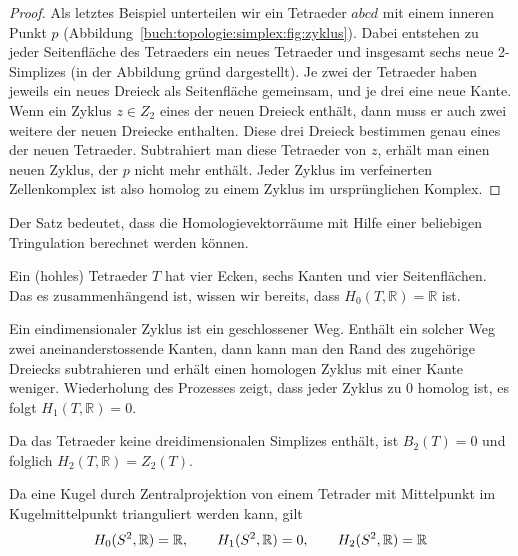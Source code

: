 \begin{proof}
Als letztes Beispiel unterteilen wir ein Tetraeder $abcd$ mit
einem inneren Punkt $p$ (Abbildung~\ref{buch:topologie:simplex:fig:zyklus}).
%
Dabei entstehen zu jeder Seitenfläche des Tetraeders ein neues 
Tetraeder und insgesamt sechs neue 2-Simplizes (in der Abbildung
gründ dargestellt).
Je zwei der Tetraeder haben jeweils ein neues Dreieck als Seitenfläche
gemeinsam, und je drei eine neue Kante.
Wenn ein Zyklus $z\in Z_2$ eines der neuen Dreieck enthält, dann
muss er auch zwei weitere der neuen Dreiecke enthalten.
Diese drei Dreieck bestimmen genau eines der neuen Tetraeder.
Subtrahiert man diese Tetraeder von $z$, erhält man einen neuen
Zyklus, der $p$ nicht mehr enthält.
Jeder Zyklus im verfeinerten Zellenkomplex ist also homolog
zu einem Zyklus im ursprünglichen Komplex.
\end{proof}

Der Satz bedeutet, dass die Homologievektorräume mit Hilfe einer
beliebigen Tringulation berechnet werden können.

\begin{beispiel}
\label{buch:topologie:euler:beispiel:tetraeder}
Ein (hohles) Tetraeder $T$ hat vier Ecken, sechs Kanten und vier Seitenflächen.
Das es zusammenhängend ist, wissen wir bereits, dass
$H_0(T,\mathbb{R})=\mathbb{R}$ ist.

Ein eindimensionaler Zyklus ist ein geschlossener Weg.
Enthält ein solcher Weg zwei aneinanderstossende Kanten, dann kann
man den Rand des zugehörige Dreiecks subtrahieren und erhält
einen homologen Zyklus mit einer Kante weniger.
Wiederholung des Prozesses zeigt, dass jeder Zyklus zu 0 homolog
ist, es folgt $H_1(T,\mathbb{R})=0$.

Da das Tetraeder keine dreidimensionalen Simplizes enthält, ist 
$B_2(T)=0$ und folglich $H_2(T,\mathbb{R})=Z_2(T)$.
\end{beispiel}

\begin{beispiel}
\label{buch:topologie:euler:beispiel:kugel}
Da eine Kugel durch Zentralprojektion von einem Tetrader mit
Mittelpunkt im Kugelmittelpunkt trianguliert werden kann, gilt
\[
H_0(S^2,\mathbb{R}) = \mathbb{R},\qquad
H_1(S^2,\mathbb{R}) = 0,\qquad
H_2(S^2,\mathbb{R}) = \mathbb{R}
\qedhere
\]
\end{beispiel}

%

